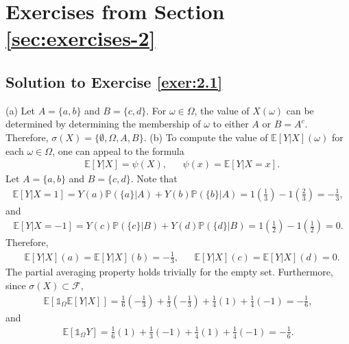\documentclass[12pt]{book}
\numberwithin{equation}{chapter}
\theoremstyle{plain}
\numberwithin{theorem}{section}
\theoremstyle{definition}
\numberwithin{exercise}{chapter}
\newcommand{\<}{\langle}
\renewcommand{\>}{\rangle}
\renewcommand{\(}{\left(}
\renewcommand{\)}{\right)}
\renewcommand{\[}{\left[}
\renewcommand{\]}{\right]}
\newcommand\Eb{\mathds{E}}
\newcommand\Ib{\mathds{1}} 	%
\newcommand\Pb{\mathds{P}}
\newcommand\Fc{\mathscr{F}}
\begin{document}

\section{Exercises from Section \ref{sec:exercises-2}}

\subsection*{Solution to Exercise \ref{exer:2.1}}
(a)
Let $A = \{ a, b\}$ and $B = \{c ,d\}$. For $\omega \in \Omega$, the value of $X(\omega)$ can be determined by 
determining the membership of $\omega$ to either $A$ or $B = A^c$. Therefore, $\sigma(X) = \{ \emptyset, \Omega, 
A,B\}$. 
(b)
To compute the value of $\Eb[ Y | X](\omega)$ for each $\omega \in \Omega$, one can appeal to the formula
\begin{align}
&\Eb[Y | X] 
	= \psi(X),
&&\psi(x)
	= \Eb[ Y | X = x].
\end{align}
Let $A = \{ a,b \}$ and $B = \{ c,d \}$. Note that 
\begin{align}
\Eb[ Y | X = 1]
	= Y(a) \Pb( \{ a \} | A) + Y(b) \Pb( \{ b \} | A)
	= 1 \( \frac{1}{3} \) - 1 \( \frac{2}{3}\) 
	= -\frac{1}{3},
\end{align}
and
\begin{align}
\Eb[ Y | X = -1]
	= Y(c) \Pb( \{ c \} | B)
		+ Y(d) \Pb( \{ d \} | B)
	= 1 \( \frac{1}{2} \) - 1 \( \frac{1}{2} \)
	= 0.
\end{align}
Therefore, 
\begin{align}
&\Eb[Y | X](a) 
	= \Eb[ Y | X ] (b) 
	= - \frac{1}{3},
&&\Eb[ Y | X](c)
	= \Eb[ Y | X](d)
	= 0.
\end{align}
The partial averaging property holds trivially for the empty set. Furthermore, since $\sigma(X) \subset \Fc$, 
\begin{align}
\Eb[ \Ib_\Omega \Eb[ Y | X]]
	= \frac{1}{6} \(- \frac{1}{3} \)
	+ \frac{1}{3} \( - \frac{1}{3} \)
	+ \frac{1}{4} \( 1 \)
	+ \frac{1}{4} \( -1 \) 
	= - \frac{1}{6},	
\end{align}
and
\begin{align}
\Eb[ \Ib_\Omega Y]
	= \frac{1}{6} \(1 \)
	+ \frac{1}{3} \( - 1 \)
	+ \frac{1}{4} \( 1 \)
	+ \frac{1}{4} \( -1 \)  
	= - \frac{1}{6}.
\end{align}
\end{document}
